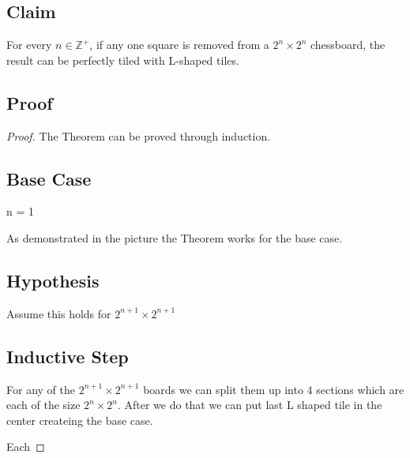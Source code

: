\documentclass[answers]{exam}
\begin{document}
\begin{questions}
			\begin{solution}
        
                \subsection*{Claim}
				For every $n \in \mathbb{Z}^+$, if any one square is removed from a $2^n \times 2^n$ chessboard, the result can be perfectly tiled with L-shaped tiles.

				 \subsection*{Proof}

               \begin{proof}
				The Theorem can be proved through induction. 

                \subsection*{Base Case}
                n = 1


As demonstrated in the picture the Theorem works for the base case.

\subsection*{Hypothesis}
 Assume this holds for $2^{n + 1} \times 2^{n+ 1}$

\subsection*{Inductive Step}
For any of the $2^{n + 1} \times 2^{n+ 1}$ boards we can split them up into 4 sections which are each of the size $2^{n} \times 2^{n}$. After we do that we can put last L shaped tile in the center createing the base case. 

Each



\end{proof}
\end{solution}
\end{questions}
\end{document}
